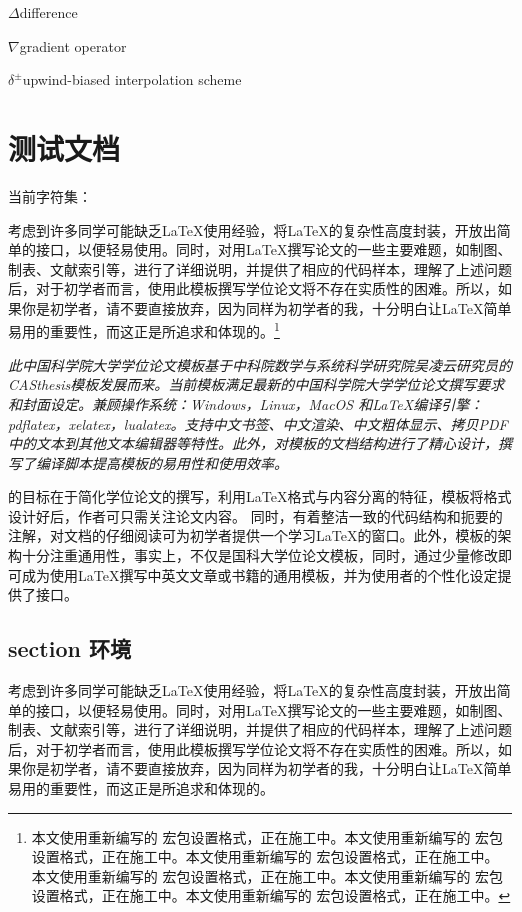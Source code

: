 \documentclass[
  fontset = mac,
]{shtthesis}
\begin{document}
\begin{nomenclatures}[算子 \& 说明]
  \item{$\Delta$}{difference}
  \item{$\nabla$}{gradient operator}
  \item{$\delta^{\pm}$}{upwind-biased interpolation scheme}
\end{nomenclatures}

\mainmatter
\chapter{\ShtThesis 测试文档}
当前字符集：\texttt{\currentfontset}

考虑到许多同学可能缺乏\LaTeX{}使用经验，\shtthesis 将\LaTeX{}的复杂性高度封装，开放出简单的接口，以便轻易使用。同时，对用\LaTeX{}撰写论文的一些主要难题，如制图、制表、文献索引等，进行了详细说明，并提供了相应的代码样本，理解了上述问题后，对于初学者而言，使用此模板撰写学位论文将不存在实质性的困难。所以，如果你是初学者，请不要直接放弃，因为同样为初学者的我，十分明白让\LaTeX{}简单易用的重要性，而这正是\shtthesis 所追求和体现的。\footnote{本文使用重新编写的 \shtthesis  宏包设置格式，正在施工中。本文使用重新编写的 \shtthesis  宏包设置格式，正在施工中。本文使用重新编写的 \shtthesis  宏包设置格式，正在施工中。本文使用重新编写的 \shtthesis  宏包设置格式，正在施工中。本文使用重新编写的 \shtthesis  宏包设置格式，正在施工中。本文使用重新编写的 \shtthesis  宏包设置格式，正在施工中。}

\emph{此中国科学院大学学位论文模板\shtthesis 基于中科院数学与系统科学研究院吴凌云研究员的CASthesis模板发展而来。当前\shtthesis 模板满足最新的中国科学院大学学位论文撰写要求和封面设定。兼顾操作系统：Windows，Linux，MacOS 和\LaTeX{}编译引擎：pdflatex，xelatex，lualatex。支持中文书签、中文渲染、中文粗体显示、拷贝PDF中的文本到其他文本编辑器等特性。此外，对模板的文档结构进行了精心设计，撰写了编译脚本提高模板的易用性和使用效率。}

{\fangsong \shtthesis 的目标在于简化学位论文的撰写，利用\LaTeX{}格式与内容分离的特征，模板将格式设计好后，作者可只需关注论文内容。 同时，\shtthesis 有着整洁一致的代码结构和扼要的注解，对文档的仔细阅读可为初学者提供一个学习\LaTeX{}的窗口。此外，模板的架构十分注重通用性，事实上，\shtthesis 不仅是国科大学位论文模板，同时，通过少量修改即可成为使用\LaTeX{}撰写中英文文章或书籍的通用模板，并为使用者的个性化设定提供了接口。}

\section{\ShtThesis section 环境}
考虑到许多同学可能缺乏\LaTeX{}使用经验，\shtthesis 将\LaTeX{}的复杂性高度封装，开放出简单的接口，以便轻易使用。同时，对用\LaTeX{}撰写论文的一些主要难题，如制图、制表、文献索引等，进行了详细说明，并提供了相应的代码样本，理解了上述问题后，对于初学者而言，使用此模板撰写学位论文将不存在实质性的困难。所以，如果你是初学者，请不要直接放弃，因为同样为初学者的我，十分明白让\LaTeX{}简单易用的重要性，而这正是\shtthesis 所追求和体现的。
\end{document}
